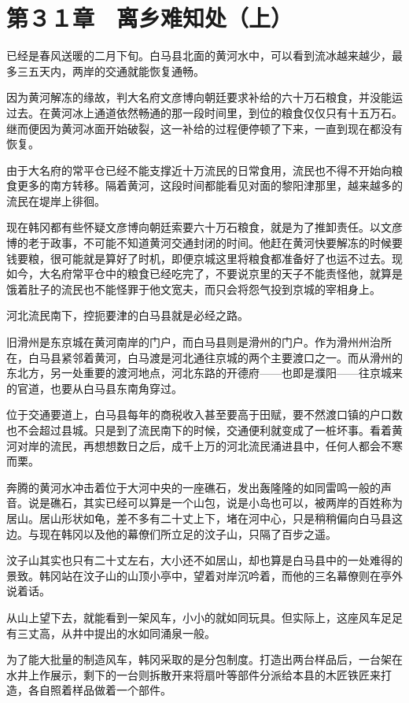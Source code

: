 \section{第３１章　离乡难知处（上）}

已经是春风送暖的二月下旬。白马县北面的黄河水中，可以看到流冰越来越少，最多三五天内，两岸的交通就能恢复通畅。

因为黄河解冻的缘故，判大名府文彦博向朝廷要求补给的六十万石粮食，并没能运过去。在黄河冰上通道依然畅通的那一段时间里，到位的粮食仅仅只有十五万石。继而便因为黄河冰面开始破裂，这一补给的过程便停顿了下来，一直到现在都没有恢复。

由于大名府的常平仓已经不能支撑近十万流民的日常食用，流民也不得不开始向粮食更多的南方转移。隔着黄河，这段时间都能看见对面的黎阳津那里，越来越多的流民在堤岸上徘徊。

现在韩冈都有些怀疑文彦博向朝廷索要六十万石粮食，就是为了推卸责任。以文彦博的老于政事，不可能不知道黄河交通封闭的时间。他赶在黄河快要解冻的时候要钱要粮，很可能就是算好了时机，即便京城这里将粮食都准备好了也运不过去。现如今，大名府常平仓中的粮食已经吃完了，不要说京里的天子不能责怪他，就算是饿着肚子的流民也不能怪罪于他文宽夫，而只会将怨气投到京城的宰相身上。

河北流民南下，控扼要津的白马县就是必经之路。

旧滑州是东京城在黄河南岸的门户，而白马县则是滑州的门户。作为滑州州治所在，白马县紧邻着黄河，白马渡是河北通往京城的两个主要渡口之一。而从滑州的东北方，另一处重要的渡河地点，河北东路的开德府——也即是濮阳——往京城来的官道，也要从白马县东南角穿过。

位于交通要道上，白马县每年的商税收入甚至要高于田赋，要不然渡口镇的户口数也不会超过县城。只是到了流民南下的时候，交通便利就变成了一桩坏事。看着黄河对岸的流民，再想想数日之后，成千上万的河北流民涌进县中，任何人都会不寒而栗。

奔腾的黄河水冲击着位于大河中央的一座礁石，发出轰隆隆的如同雷鸣一般的声音。说是礁石，其实已经可以算是一个山包，说是小岛也可以，被两岸的百姓称为居山。居山形状如龟，差不多有二十丈上下，堵在河中心，只是稍稍偏向白马县这边。与现在韩冈以及他的幕僚们所立足的汶子山，只隔了百步之遥。

汶子山其实也只有二十丈左右，大小还不如居山，却也算是白马县中的一处难得的景致。韩冈站在汶子山的山顶小亭中，望着对岸沉吟着，而他的三名幕僚则在亭外说着话。

从山上望下去，就能看到一架风车，小小的就如同玩具。但实际上，这座风车足足有三丈高，从井中提出的水如同涌泉一般。

为了能大批量的制造风车，韩冈采取的是分包制度。打造出两台样品后，一台架在水井上作展示，剩下的一台则拆散开来将扇叶等部件分派给本县的木匠铁匠来打造，各自照着样品做着一个部件。

